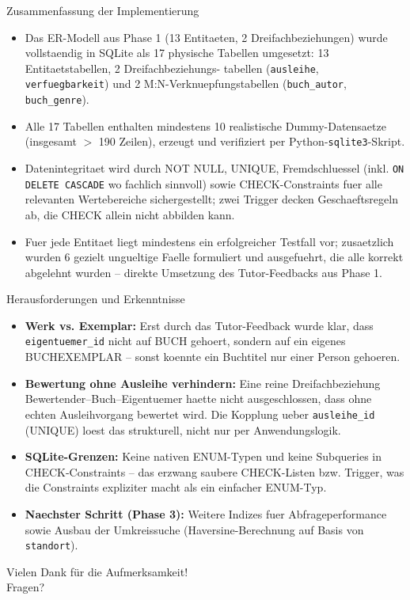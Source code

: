 \documentclass[11pt,aspectratio=169]{beamer}
\begin{document}
\begin{frame}{Zusammenfassung der Implementierung}
  \begin{itemize}
    \item Das ER-Modell aus Phase 1 (13 Entitaeten, 2 Dreifachbeziehungen) wurde vollstaendig
      in SQLite als 17 physische Tabellen umgesetzt: 13 Entitaetstabellen, 2 Dreifachbeziehungs-
      tabellen (\texttt{ausleihe}, \texttt{verfuegbarkeit}) und 2 M:N-Verknuepfungstabellen
      (\texttt{buch\_autor}, \texttt{buch\_genre}).
    \item Alle 17 Tabellen enthalten mindestens 10 realistische Dummy-Datensaetze
      (insgesamt $>$ 190 Zeilen), erzeugt und verifiziert per Python-\texttt{sqlite3}-Skript.
    \item Datenintegritaet wird durch NOT NULL, UNIQUE, Fremdschluessel (inkl. \texttt{ON
      DELETE CASCADE} wo fachlich sinnvoll) sowie CHECK-Constraints fuer alle relevanten
      Wertebereiche sichergestellt; zwei Trigger decken Geschaeftsregeln ab, die CHECK allein
      nicht abbilden kann.
    \item Fuer jede Entitaet liegt mindestens ein erfolgreicher Testfall vor; zusaetzlich
      wurden 6 gezielt ungueltige Faelle formuliert und ausgefuehrt, die alle korrekt
      abgelehnt wurden -- direkte Umsetzung des Tutor-Feedbacks aus Phase 1.
  \end{itemize}
\end{frame}

\begin{frame}{Herausforderungen und Erkenntnisse}
  \small
  \begin{itemize}
    \item \textbf{Werk vs. Exemplar:} Erst durch das Tutor-Feedback wurde klar, dass
      \texttt{eigentuemer\_id} nicht auf BUCH gehoert, sondern auf ein eigenes
      BUCHEXEMPLAR -- sonst koennte ein Buchtitel nur einer Person gehoeren.
    \item \textbf{Bewertung ohne Ausleihe verhindern:} Eine reine Dreifachbeziehung
      Bewertender--Buch--Eigentuemer haette nicht ausgeschlossen, dass ohne echten
      Ausleihvorgang bewertet wird. Die Kopplung ueber \texttt{ausleihe\_id} (UNIQUE)
      loest das strukturell, nicht nur per Anwendungslogik.
    \item \textbf{SQLite-Grenzen:} Keine nativen ENUM-Typen und keine Subqueries in
      CHECK-Constraints -- das erzwang saubere CHECK-Listen bzw. Trigger, was die
      Constraints expliziter macht als ein einfacher ENUM-Typ.
    \item \textbf{Naechster Schritt (Phase 3):} Weitere Indizes fuer Abfrageperformance
      sowie Ausbau der Umkreissuche (Haversine-Berechnung auf Basis von \texttt{standort}).
  \end{itemize}
\end{frame}

\begin{frame}
  \centering
  \Large Vielen Dank für die Aufmerksamkeit!\\[6pt]
  \normalsize Fragen?
\end{frame}
\end{document}
